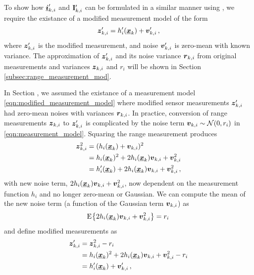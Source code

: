 \documentclass[10pt,letterpaper,oneside,twocolumn,journal]{IEEEtran}
\theoremstyle{definition}
\theoremstyle{definition}
\theoremstyle{remark}
\begin{document}
To show how ${\boldsymbol{\underline{i}}}'_{k,i}$ and ${{\mathbf{I}}}'_{k,i}$ can be formulated in a similar manner using , we require the existance of a modified measurement model of the form
\begin{equation}
    \rv{z}'_{k,i} = h'_i(\rvec{x}_k)+\rv{v}'_{k,i}\,, \label{eqn:modified_measurement_model}
\end{equation}
where ${\boldsymbol{z}}'_{k,i}$ is the modified measurement, and noise ${\boldsymbol{v}}'_{k,i}$ is zero-mean with known variance. The approximation of ${\boldsymbol{z}}'_{k,i}$ and its noise variance ${\boldsymbol{r}}_{k,i}$ from original measurements and variances ${\boldsymbol{z}}_{k,i}$ and $r_i$ will be shown in Section \ref{subsec:range_measurement_mod}. 


In Section , we assumed the existance of a measurement model \eqref{eqn:modified_measurement_model} where modified sensor measurements ${\boldsymbol{z}}'_{k,i}$ had zero-mean noises with variances ${\boldsymbol{r}}_{k,i}$. In practice, conversion of range measurements ${\boldsymbol{z}}_{k,i}$ to ${\boldsymbol{z}}'_{k,i}$ is complicated by the noise term ${\boldsymbol{v}}_{k,i} \sim \mathcal{N}(0, r_i)$ in \eqref{eqn:measurement_model}. Squaring the range measurement produces
\begin{equation}
    \begin{split}
        {\boldsymbol{z}}_{k,i}^2 &= (h_i({\boldsymbol{\underline{x}}}_k) + {\boldsymbol{v}}_{k,i})^2 \\
        &= h_i({\boldsymbol{\underline{x}}}_k)^2 + 2h_i({\boldsymbol{\underline{x}}}_k){\boldsymbol{v}}_{k,i} + {\boldsymbol{v}}_{k,i}^2 \\
        &= h'_i({\boldsymbol{\underline{x}}}_k) + 2h_i({\boldsymbol{\underline{x}}}_k){\boldsymbol{v}}_{k,i} + {\boldsymbol{v}}_{k,i}^2\,,
    \end{split}
\end{equation}
with new noise term, $2h_i({\boldsymbol{\underline{x}}}_k){\boldsymbol{v}}_{k,i} + {\boldsymbol{v}}_{k,i}^2$, now dependent on the measurement function $h_i$ and no longer zero-mean or Gaussian. We can compute the mean of the new noise term (a function of the Gaussian term ${\boldsymbol{v}}_{k,i}$) as
\begin{equation}
    \E{2h_i(\rvec{x}_k)\rv{v}_{k,i} + \rv{v}_{k,i}^2} = r_i\, \label{eqn:modified_noise_mean}
\end{equation}
and define modified measurements as
\begin{equation} \label{eqn:modified_measurement}
    \begin{split}
        \rv{z}'_{k,i} &= \rv{z}_{k,i}^2 - r_i \\
        &= h_i(\rvec{x}_k)^2 + 2h_i(\rvec{x}_k)\rv{v}_{k,i} + \rv{v}_{k,i}^2 - r_i \\
        &= h'_i(\rvec{x}_k) + \rv{v}'_{k,i}\,,
    \end{split}
\end{equation}
\end{document}
